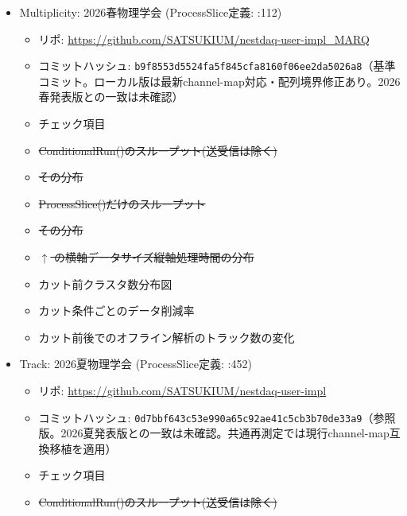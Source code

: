 \documentclass[../main.tex]{subfiles}
\begin{document}
\begin{tcolorbox}
\begin{itemize}
\begin{itemize}
\begin{itemize}
      \item カット前TOF分布図(ptag132.pdfと矛盾はないか)
      \item カット範囲の決定(ptag132.pdfと矛盾はないか)
      \item カット前後のデータ削減率(ptag132.pdfと矛盾はないか)
      \item カット後TOF分布図
    \end{itemize}
    \item Multiplicity: 2026春物理学会 (ProcessSlice定義: :112)
    \begin{itemize}
      \item リポ: \url{https://github.com/SATSUKIUM/nestdaq-user-impl_MARQ}
      \item コミットハッシュ: \texttt{b9f8553d5524fa5f845cfa8160f06ee2da5026a8}（基準コミット。ローカル版は最新channel-map対応・配列境界修正あり。2026春発表版との一致は未確認）
      \item チェック項目
      \item \sout{ConditionalRun()のスループット(送受信は除く)}
      \item \sout{その分布}
      \item \sout{ProcessSlice()だけのスループット}
      \item \sout{その分布}
      \item \sout{$\uparrow$ の横軸データサイズ縦軸処理時間の分布}
      \item カット前クラスタ数分布図
      \item カット条件ごとのデータ削減率
      \item カット前後でのオフライン解析のトラック数の変化
    \end{itemize}
    \item Track: 2026夏物理学会 (ProcessSlice定義: :452)
    \begin{itemize}
      \item リポ: \url{https://github.com/SATSUKIUM/nestdaq-user-impl}
      \item コミットハッシュ: \texttt{0d7bbf643c53e990a65c92ae41c5cb3b70de33a9}（参照版。2026夏発表版との一致は未確認。共通再測定では現行channel-map互換移植を適用）
      \item チェック項目
      \item \sout{ConditionalRun()のスループット(送受信は除く)}

\end{itemize}
\end{itemize}
\end{itemize}
\end{tcolorbox}
\end{document}
